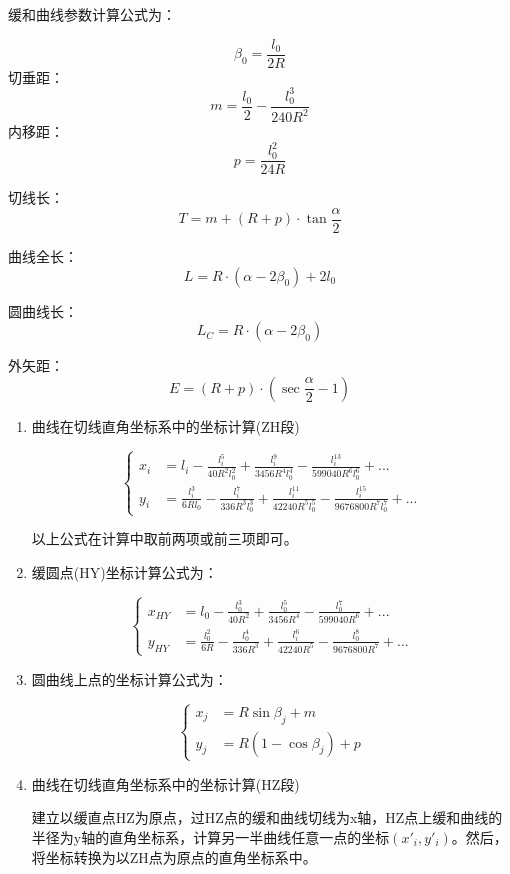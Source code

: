  缓和曲线参数计算公式为：

 $$\beta_0 = \frac{l_0}{2R} $$
切垂距：
$$m=\frac{l_0}{2} - \frac{l^3_0}{240R^2}$$
内移距：
$$p=\frac{l^2_0}{24R}$$

 
 切线长：$$T = m+ (R+p) \cdot \tan \frac{\alpha}{2}$$

 曲线全长：$$L = R \cdot (\alpha-2\beta_0)  + 2l_0$$

 圆曲线长：$$L_C = R \cdot (\alpha-2\beta_0)$$

 外矢距：$$E=(R+p) \cdot (\sec \frac{\alpha}{2} - 1)$$

\begin{enumerate}

\item  曲线在切线直角坐标系中的坐标计算(ZH段)

\[
\left \{ \begin{aligned}
x_i &= l_i - \frac{l^5_i}{40R^2 l^2_0} + \frac{l^9_i}{3456R^4 l^4_0} - \frac{l^{13}_i}{599040R^6l^6_0} + ...  \\
y_i &=  \frac{l^3_i}{6Rl_0} - \frac{l^7_i}{336R^3 l^3_0} + \frac{l^{11}_i}{42240R^5l^5_0} -\frac{l^{15}_i}{9676800R^7l^7_0}+ ...  
\end{aligned} \right.
\]

以上公式在计算中取前两项或前三项即可。

\item  缓圆点(HY)坐标计算公式为：

\[
\left \{ \begin{aligned}
x_{HY} &= l_0 - \frac{l^3_0}{40R^2} + \frac{l^5_0}{3456R^4} - \frac{l^{7}_0}{599040R^6} + ...  \\
y_{HY} &=  \frac{l^2_0}{6R} - \frac{l^4_0}{336R^3} + \frac{l^{6}_i}{42240R^5} -\frac{l^{8}_0}{9676800R^7}+ ...  
\end{aligned} \right.
\]

\item  圆曲线上点的坐标计算公式为：

\[
\left \{ \begin{aligned}
x_{j} &= R \sin \beta_j + m \\
y_{j} &= R(1- \cos \beta_j) +p 
\end{aligned} \right.
\]

\item  曲线在切线直角坐标系中的坐标计算(HZ段)

建立以缓直点HZ为原点，过HZ点的缓和曲线切线为x轴，HZ点上缓和曲线的
半径为y轴的直角坐标系，计算另一半曲线任意一点的坐标$(x'_i, y'_i)$。然后，
将坐标转换为以ZH点为原点的直角坐标系中。


\end{enumerate}
